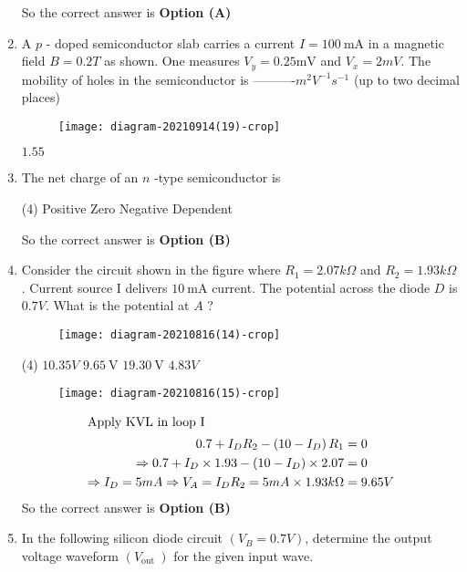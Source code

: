 \begin{enumerate}
\begin{answer}
		So the correct answer is \textbf{Option (A)}
	\end{answer}
	\item A $p$ - doped semiconductor slab carries a current $I=100 \mathrm{~mA}$ in a magnetic field $B=0.2 T$ as shown. One measures $V_{y}=0.25 \mathrm{mV}$ and $V_{x}=2 m V .$ The mobility of holes in the semiconductor is ----------$m^{2} V^{-1} s^{-1}$ (up to two decimal places)
	{	}
	\begin{figure}[H]
		\centering
		\texttt{[image: diagram-20210914(19)-crop]}
	\end{figure}
	\begin{answer}
		$1.55$
	\end{answer}
\item The net charge of an $n$ -type semiconductor is
{}

\begin{tasks}(4)
\task[\textbf{A.}] Positive
\task[\textbf{B.}] Zero
\task[\textbf{C.}] Negative
\task[\textbf{D.}] Dependent
\end{tasks}
\begin{answer}
So the correct answer is \textbf{Option (B)}
\end{answer}
	\item Consider the circuit shown in the figure where $R_{1}=2.07 k \Omega$ and $R_{2}=1.93 k \Omega$. Current source I delivers $10 \mathrm{~mA}$ current. The potential across the diode $D$ is $0.7 V$. What is the potential at $A$ ?
{}

\begin{figure}[H]
\centering
\texttt{[image: diagram-20210816(14)-crop]}
\end{figure}
\begin{tasks}(4)
\task[\textbf{A.}] $10.35 V$
\task[\textbf{B.}] $9.65 \mathrm{~V}$
\task[\textbf{C.}] $19.30 \mathrm{~V}$
\task[\textbf{D.}] $4.83 V$
\end{tasks}
\begin{answer}
\begin{figure}[H]
	\centering
	\texttt{[image: diagram-20210816(15)-crop]}
\end{figure}
\begin{align*}
\intertext{Apply KVL in loop I}
0.7+I_{D} R_{2}-\left(10-I_{D}\right) R_{1}&=0\\
\Rightarrow 0.7+I_{D} \times 1.93-\left(10-I_{D}\right) \times 2.07&=0\\
\Rightarrow I_{D}=5 m A \Rightarrow V_{A}=I_{D} R_{2}=5 m A \times 1.93 k \Omega&=9.65 V
\end{align*}
So the correct answer is \textbf{Option (B)}
\end{answer}
\item In the following silicon diode circuit $\left(V_{B}=0.7 V\right)$, determine the output voltage waveform $\left(V_{\text {out }}\right)$ for the given input wave.
{}


\end{enumerate}
